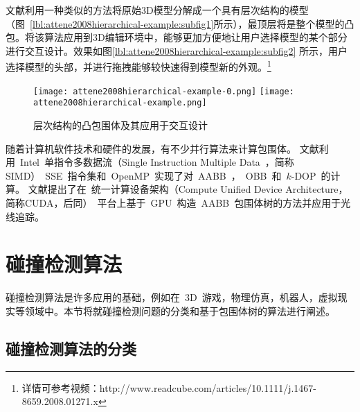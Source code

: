 文献利用一种类似的方法将原始3D模型分解成一个具有层次结构的模型（图~\ref{lbl:attene2008hierarchical-example:subfig1}所示），最顶层将是整个模型的凸包。将该算法应用到3D编辑环境中，能够更加方便地让用户选择模型的某个部分进行交互设计。效果如图\ref{lbl:attene2008hierarchical-example:subfig2} 所示，用户选择模型的头部，并进行拖拽能够较快速得到模型新的外观。\footnote{详情可参考视频：http://www.readcube.com/articles/10.1111/j.1467-8659.2008.01271.x }
\begin{figure}[htbp]
  \centering
    {\texttt{[image: attene2008hierarchical-example-0.png]}}
    {\texttt{[image: attene2008hierarchical-example.png]}}
  \caption{层次结构的凸包围体及其应用于交互设计\cite{attene2008hierarchical}}
  \label{lbl:attene2008hierarchical-example}
\end{figure}

随着计算机软件技术和硬件的发展，有不少并行算法来计算包围体。
文献利用~Intel~单指令多数据流（Single Instruction
Multiple Data~，简称SIMD）~SSE~指令集和~OpenMP~实现了对~AABB~，~OBB~和~$k$-DOP~的计算。
文献提出了在~统一计算设备架构（Compute Unified Device
Architecture，简称CUDA，后同）~平台上基于~GPU~构造~AABB~包围体树的方法并应用于光线追踪。

\section{碰撞检测算法}
\label{sec:collisiondetection}

碰撞检测算法是许多应用的基础，例如在~3D~游戏，物理仿真，机器人，虚拟现实等领域中。本节将就碰撞检测问题的分类和基于包围体树的算法进行阐述。

\subsection{碰撞检测算法的分类}
\label{sec:cd-category}

